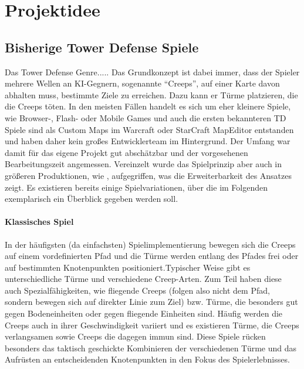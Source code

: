 \section{Projektidee} %
\label{sec:projektidee}



\subsection{Bisherige Tower Defense Spiele}

Das Tower Defense Genre..... Das Grundkonzept ist dabei immer, dass der Spieler mehrere Wellen an KI-Gegnern, sogenannte \enquote{Creeps}, auf einer Karte davon abhalten muss, bestimmte Ziele zu erreichen. Dazu kann er Türme platzieren, die die Creeps töten. In den meisten Fällen handelt es sich um eher kleinere Spiele, wie Browser-, Flash- oder Mobile Games und auch die ersten bekannteren TD Spiele sind als Custom Maps im Warcraft oder StarCraft MapEditor entstanden und haben daher kein großes Entwicklerteam im Hintergrund. Der Umfang war damit für das eigene Projekt gut abschätzbar und der vorgesehenen Bearbeitungszeit angemessen. Vereinzelt wurde das Spielprinzip aber auch in größeren Produktionen, wie \todo{\dots}, aufgegriffen, was die Erweiterbarkeit des Ansatzes zeigt. Es existieren bereits einige Spielvariationen, über die im Folgenden exemplarisch ein Überblick gegeben werden soll.

\paragraph{Klassisches Spiel}
In der häufigsten (da einfachsten) Spielimplementierung bewegen sich die Creeps auf einem vordefinierten Pfad und die Türme werden entlang des Pfades frei oder auf bestimmten Knotenpunkten positioniert.Typischer Weise gibt es unterschiedliche Türme und verschiedene Creep-Arten. Zum Teil haben diese auch Spezialfähigkeiten, wie fliegende Creeps (folgen also nicht dem Pfad, sondern bewegen sich auf direkter Linie zum Ziel) bzw. Türme, die besonders gut gegen Bodeneinheiten oder gegen fliegende Einheiten sind. Häufig werden die Creeps auch in ihrer Geschwindigkeit variiert und es existieren Türme, die Creeps verlangsamen sowie Creeps die dagegen immun sind.  Diese Spiele rücken besonders das taktisch geschickte Kombinieren der verschiedenen Türme und das Aufrüsten an entscheidenden Knotenpunkten in den Fokus des Spielerlebnisses.


